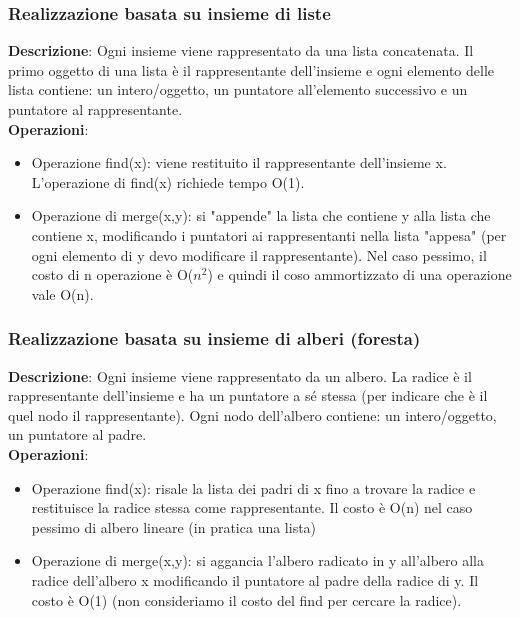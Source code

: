 \documentclass[../cheatSheetAlgoritmi.tex]{subfiles}
\begin{document}
\subsubsection{Realizzazione basata su insieme di liste}
\textbf{Descrizione}: Ogni insieme viene rappresentato da una lista concatenata. Il primo oggetto di una lista è il rappresentante dell'insieme e ogni elemento delle lista contiene: un intero/oggetto, un puntatore all'elemento successivo e un puntatore al rappresentante.\\
\textbf{Operazioni}:
\begin{itemize}
	\item Operazione find(x): viene restituito il rappresentante dell'insieme x. L'operazione di find(x) richiede tempo O(1).
	\item Operazione di merge(x,y): si "appende" la lista che contiene y alla lista che contiene x, modificando i puntatori ai rappresentanti nella lista "appesa" (per ogni elemento di y devo modificare il rappresentante). Nel caso pessimo, il costo di n operazione è O($n^{2}$) e quindi il coso ammortizzato di una operazione vale O(n). 
\end{itemize}
\subsubsection{Realizzazione basata su insieme di alberi (foresta)}
\textbf{Descrizione}: Ogni insieme viene rappresentato da un albero. La radice è il rappresentante dell'insieme e ha un puntatore a sé stessa (per indicare che è il quel nodo il rappresentante). Ogni nodo dell'albero contiene: un intero/oggetto, un puntatore al padre.\\
\textbf{Operazioni}:
\begin{itemize}
	\item Operazione find(x): risale la lista dei padri di x fino a trovare la radice e restituisce la radice stessa come rappresentante. Il costo è O(n) nel caso pessimo di albero lineare (in pratica una lista)
	\item Operazione di merge(x,y): si aggancia l'albero radicato in y all'albero alla radice dell'albero x modificando il puntatore al padre della radice di y. Il costo è O(1) (non consideriamo il costo del find per cercare la radice).  
\end{itemize}
\end{document}
